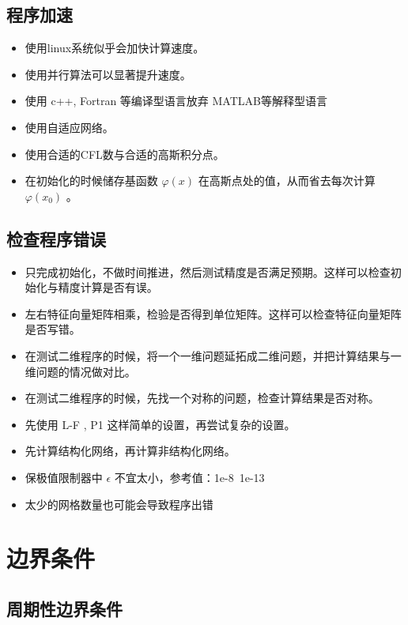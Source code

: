 \documentclass{book}
\begin{document}
\begin{example}
\begin{example}{}{}
\begin{example}
\begin{example}
\begin{example}
\subsection{程序加速}
\begin{itemize}
    \item 使用linux系统似乎会加快计算速度。
    \item 使用并行算法可以显著提升速度。
    \item 使用 c++, Fortran 等编译型语言放弃 MATLAB等解释型语言
    \item 使用自适应网络。
    \item 使用合适的CFL数与合适的高斯积分点。
    \item 在初始化的时候储存基函数 $\varphi(x)$ 在高斯点处的值，从而省去每次计算 $\varphi(x_0)$ 。
\end{itemize}
\subsection{检查程序错误}
\begin{itemize}
    \item 只完成初始化，不做时间推进，然后测试精度是否满足预期。这样可以检查初始化与精度计算是否有误。
    \item 左右特征向量矩阵相乘，检验是否得到单位矩阵。这样可以检查特征向量矩阵是否写错。
    \item 在测试二维程序的时候，将一个一维问题延拓成二维问题，并把计算结果与一维问题的情况做对比。
    \item 在测试二维程序的时候，先找一个对称的问题，检查计算结果是否对称。
    \item 先使用 L-F , P1 这样简单的设置，再尝试复杂的设置。
    \item 先计算结构化网络，再计算非结构化网络。
    \item 保极值限制器中 $\epsilon$ 不宜太小，参考值：1e-8~1e-13
    \item 太少的网格数量也可能会导致程序出错
\end{itemize}

\section{边界条件}
\subsection{周期性边界条件}

\end{example}
\end{example}
\end{example}
\end{example}
\end{example}
\end{document}
